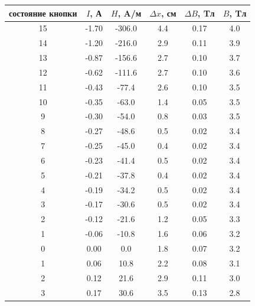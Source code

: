 \documentclass[a4paper,14pt]{article}
\begin{document}
\begin{table}[hbt!]
	\begin{center}
		\begin{tabular}{|c|c|c|c|c|c|}
			\hline
			состояние кнопки & $I$, А     & $H$, A/м          & $\Delta x$, см & $\Delta B$, Tл & $B$, Tл \\ \hline
15               & -1.70  & -306.0  & 4.4         & 0.17        & 4.0   \\ \hline
14               & -1.20  & -216.0  & 2.9         & 0.11        & 3.9   \\ \hline
13               & -0.87  & -156.6  & 2.7         & 0.10        & 3.7   \\ \hline
12               & -0.62  & -111.6  & 2.7         & 0.10        & 3.6   \\ \hline
11               & -0.43  & -77.4   & 2.6         & 0.10        & 3.5   \\ \hline
10               & -0.35  & -63.0   & 1.4         & 0.05        & 3.5   \\ \hline
9                & -0.30  & -54.0   & 0.8         & 0.03        & 3.5   \\ \hline
8                & -0.27  & -48.6   & 0.5         & 0.02        & 3.4   \\ \hline
7                & -0.25  & -45.0   & 0.4         & 0.02        & 3.4   \\ \hline
6                & -0.23  & -41.4   & 0.5         & 0.02        & 3.4   \\ \hline
5                & -0.21  & -37.8   & 0.4         & 0.02        & 3.4   \\ \hline
4                & -0.19  & -34.2   & 0.5         & 0.02        & 3.4   \\ \hline
3                & -0.17  & -30.6   & 0.5         & 0.02        & 3.4   \\ \hline
2                & -0.12  & -21.6   & 1.2         & 0.05        & 3.3   \\ \hline
1                & -0.06  & -10.8   & 1.6         & 0.06        & 3.2   \\ \hline
0                & 0.00   & 0.0     & 1.8         & 0.07        & 3.2   \\ \hline
1                & 0.06   & 10.8    & 2.2         & 0.08        & 3.1   \\ \hline
2                & 0.12   & 21.6    & 2.9         & 0.11        & 3.0   \\ \hline
3                & 0.17   & 30.6    & 3.5         & 0.13        & 2.8   \\ \hline

\end{tabular}
\end{center}
\end{table}
\end{document}
